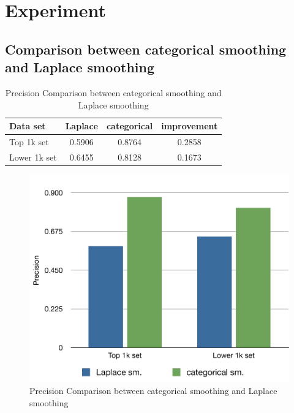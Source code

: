 \section{Experiment}

\subsection{Comparison between categorical smoothing and Laplace smoothing}

\begin{table}[t]
\caption{Precision Comparison between categorical smoothing and Laplace smoothing}
\label{tab-smoothing-comparison}
\vskip 0.15in
\begin{center}
\begin{small}
\begin{sc}
\begin{tabular}{l|cc|c}
\hline
\abovespace\belowspace
Data set & Laplace & categorical & improvement \\
\hline
\abovespace
Top 1k set & 0.5906 & 0.8764 & 0.2858 \\
\belowspace
Lower 1k set & 0.6455 & 0.8128 & 0.1673 \\
\hline
\end{tabular}
\end{sc}
\end{small}
\end{center}
\vskip -0.1in
\end{table}

\begin{figure}[ht]
\vskip 0.2in
\begin{center}
\centerline{\includegraphics[width=\columnwidth]{pvssmoothing}}
\caption{Precision Comparison between categorical smoothing and Laplace smoothing}
\label{fig-p-vs-smoothing}
\end{center}
\vskip -0.2in
\end{figure}

